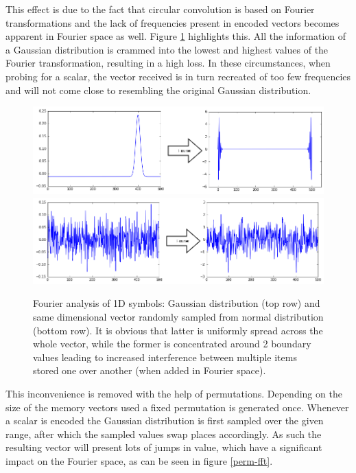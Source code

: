 \documentclass[conference]{IEEEtran}
\begin{document}
	This effect is due to the fact that circular convolution is based on Fourier transformations and the lack of frequencies present in encoded vectors becomes apparent in Fourier space as well.
Figure \ref{fft} highlights this.
All the information of a Gaussian distribution is crammed into the lowest and highest values of the Fourier transformation, resulting in a high loss.
In these circumstances, when probing for a scalar, the vector received is in turn recreated of too few frequencies and will not come close to resembling the original Gaussian distribution.


\begin{figure}[th!]
	\includegraphics[width=\columnwidth]{img/scalar-pre-perm-fft.png}
	\includegraphics[width=\columnwidth]{img/scalar-random-fft.png}
	\caption{Fourier analysis of 1D symbols: Gaussian distribution (top row) and same dimensional vector randomly sampled from normal distribution (bottom row). It is obvious that latter is uniformly spread across the whole vector, while the former is concentrated around 2 boundary values leading to increased interference between multiple items stored one over another (when added in Fourier space).}
	\label{fft}
\end{figure}
	
	This inconvenience is removed with the help of permutations.
Depending on the size of the memory vectors used a fixed permutation is generated once.
Whenever a scalar is encoded the Gaussian distribution is first sampled over the given range, after which the sampled values swap places accordingly.
As such the resulting vector will present lots of jumps in value, which have a significant impact on the Fourier space, as can be seen in figure \ref{perm-fft}.
	
\end{document}
